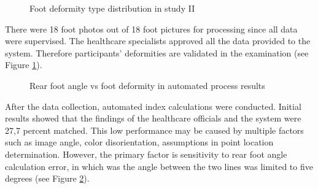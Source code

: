 \begin{figure}[htbp]
\centering
{}
\caption{Foot deformity type distribution in study II}
\label{fig:StudyIIFootDeformityTypeDistribution}
\end{figure} 

There were 18 foot photos out of 18 foot pictures for processing since all data were supervised. The healthcare specialists approved all the data provided to the system. Therefore participants' deformities are validated in the examination (see Figure  \ref{fig:StudyIIFootDeformityTypeDistribution}).

\begin{figure}[htbp]
\centering
{}
\caption{Rear foot angle vs foot deformity in automated process results}
\label{fig:StudyIIFootDeformityAutomatedDegreesAndDeformityResults}
\end{figure} 

After the data collection, automated index calculations were conducted. Initial results showed that the findings of the healthcare officials and the system were 27,7 percent matched. This low performance may be caused by multiple factors such as image angle, color disorientation, assumptions in point location determination. However, the primary factor is sensitivity to rear foot angle calculation error, in which was the angle between the two lines was limited to five degrees (see Figure \ref{fig:StudyIIFootDeformityAutomatedDegreesAndDeformityResults}). 
